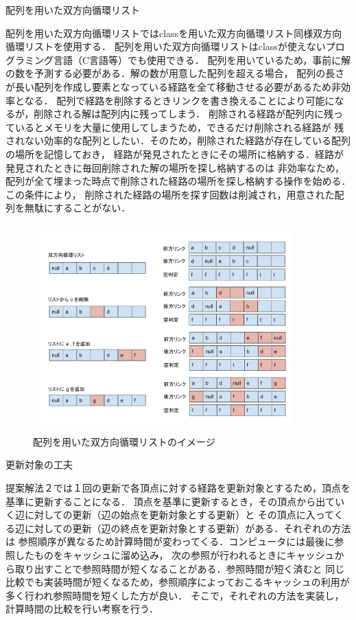 \documentclass[12pt]{optlab-bachelor}
\begin{document}
\begin{description}
  \item[配列を用いた双方向循環リスト]
\end{description}

配列を用いた双方向循環リストではclassを用いた双方向循環リスト同様双方向循環リストを使用する．
配列を用いた双方向循環リストはclassが使えないプログラミング言語（C言語等）でも使用できる．
配列を用いているため，事前に解の数を予測する必要がある．解の数が用意した配列を超える場合，
配列の長さが長い配列を作成し要素となっている経路を全て移動させる必要があるため非効率となる．
配列で経路を削除するときリンクを書き換えることにより可能になるが，削除される解は配列内に残ってしまう．
削除される経路が配列内に残っているとメモリを大量に使用してしまうため，できるだけ削除される経路が
残されない効率的な配列としたい．そのため，削除された経路が存在している配列の場所を記憶しておき，
経路が発見されたときにその場所に格納する．経路が発見されたときに毎回削除された解の場所を探し格納するのは
非効率なため，配列が全て埋まった時点で削除された経路の場所を探し格納する操作を始める．この条件により，
削除された経路の場所を探す回数は削減され，用意された配列を無駄にすることがない．

\begin{figure}[htbp]
  \centering
  \caption{配列を用いた双方向循環リストのイメージ}
  \includegraphics[height=8.0cm, width=10.0cm]{fig/fig11.pdf}
\end{figure}

\begin{description}
  \item[更新対象の工夫]
\end{description}

提案解法２では１回の更新で各頂点に対する経路を更新対象とするため，頂点を基準に更新することになる．
頂点を基準に更新するとき，その頂点から出ていく辺に対しての更新（辺の始点を更新対象とする更新）と
その頂点に入ってくる辺に対しての更新（辺の終点を更新対象とする更新）がある．それぞれの方法は
参照順序が異なるため計算時間が変わってくる．コンピュータには最後に参照したものをキャッシュに溜め込み，
次の参照が行われるときにキャッシュから取り出すことで参照時間が短くなることがある．参照時間が短く済むと
同じ比較でも実装時間が短くなるため，参照順序によっておこるキャッシュの利用が多く行われ参照時間を短くした方が良い．
そこで，それぞれの方法を実装し，計算時間の比較を行い考察を行う．
\end{document}
